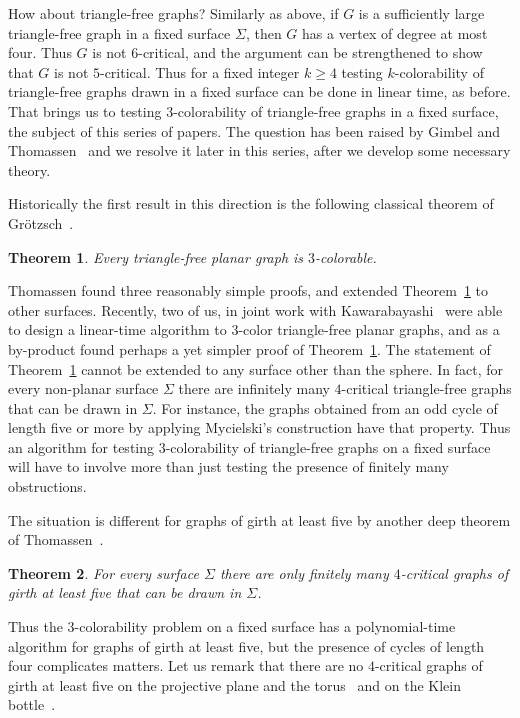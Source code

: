 \documentclass{article}
\def\mylabel#1{{\label{#1}}}
\newtheorem{theorem}{Theorem}
\begin{document}
How about triangle-free graphs?
Similarly as above, if $G$ is a sufficiently large triangle-free graph
in a fixed surface $\Sigma$, then $G$ has a vertex of degree at most four.
Thus $G$ is not $6$-critical, and the argument can be strengthened to show
that $G$ is not $5$-critical.
Thus for a fixed integer $k\ge4$ testing $k$-colorability of triangle-free graphs
drawn in a fixed surface can be done in linear time, as before.
That brings us to testing $3$-colorability of triangle-free graphs
in a fixed surface, the subject of this series of papers.
The question has been raised by
Gimbel and Thomassen~\cite{gimbel} and we resolve it later
in this series, after we develop some necessary theory.

Historically the first result in this direction is the following
classical theorem of Gr\"otzsch~\cite{grotzsch}.

\begin{theorem}
\label{grotzsch}
Every triangle-free planar graph is $3$-colorable.
\end{theorem}

Thomassen \cite{thom-torus,Tho3list,ThoShortlist}
found three reasonably simple proofs, and extended Theorem~\ref{grotzsch}
to other surfaces.  
Recently, two of us, in joint work with Kawarabayashi~\cite{DvoKawTho}
were able to design a linear-time algorithm to $3$-color triangle-free
planar graphs, and as a by-product found perhaps a yet simpler proof
of Theorem~\ref{grotzsch}.
The statement of Theorem~\ref{grotzsch}
cannot be extended to any surface other than the sphere.
In fact, for every non-planar surface $\Sigma$ there are infinitely many
$4$-critical triangle-free graphs that can be drawn in $\Sigma$.
For instance, the graphs obtained from an odd cycle of length five or more
by applying Mycielski's
construction \cite[Section~8.5]{BonMur} have that property.
Thus an algorithm for testing $3$-colorability of triangle-free graphs
on a fixed surface will have to involve more than just testing the
presence of finitely many obstructions.

The situation is different for graphs of girth at least five
by another deep theorem of Thomassen~\cite{thom-surf}.

\begin{theorem}
\mylabel{thm:thomgirth5}
For every surface $\Sigma$ there are only finitely many $4$-critical
graphs of girth at least five that can be drawn in $\Sigma$.
\end{theorem}

Thus the $3$-colorability problem on a fixed surface
has a polynomial-time algorithm
for graphs of girth at least five, but the presence of cycles of
length four complicates matters.
Let us remark that there are no $4$-critical graphs of girth at least five
on the projective plane and the torus~\cite{thom-torus} and
on the Klein bottle~\cite{thomwalls}.
\end{document}
